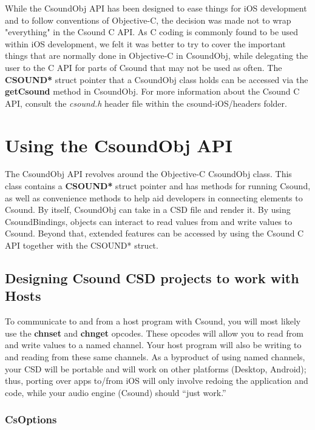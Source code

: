 \documentclass[11pt]{article}
\begin{document}
While the CsoundObj API has been designed to ease things for iOS development and to follow conventions of Objective-C, the decision was made not to wrap "everything" in the Csound C API.  As C coding is commonly found to be used within iOS development, we felt it was better to try to cover the important things that are normally done in Objective-C in CsoundObj, while delegating the user to the C API for parts of Csound that may not be used as often.  The \textbf{CSOUND*} struct pointer that a CsoundObj class holds can be accessed via the \textbf{getCsound} method in CsoundObj.  For more information about the Csound C API, consult the \textit{csound.h} header file within the csound-iOS/headers folder.

\section{Using the CsoundObj API}

The CsoundObj API revolves around the Objective-C CsoundObj class. This class contains a \textbf{CSOUND*} struct pointer and has methods for running Csound, as well as convenience methods to help aid developers in connecting elements to Csound. By itself, CsoundObj can take in a CSD file and render it.  By using CsoundBindings, objects can interact to read values from and write values to Csound.  Beyond that, extended features can be accessed by using the Csound C API together with the CSOUND* struct.

\subsection{Designing Csound CSD projects to work with Hosts}

To communicate to and from a host program with Csound, you will most likely use the \textbf{chnset} and \textbf{chnget} opcodes. These opcodes will allow you to read from and write values to a named channel.  Your host program will also be writing to and reading from these same channels.  As a byproduct of using named channels, your CSD will be portable and will work on other platforms (Desktop, Android); thus, porting over apps to/from iOS will only involve redoing the application and code, while your audio engine (Csound) should ``just work.''

\subsubsection{CsOptions}
\end{document}
